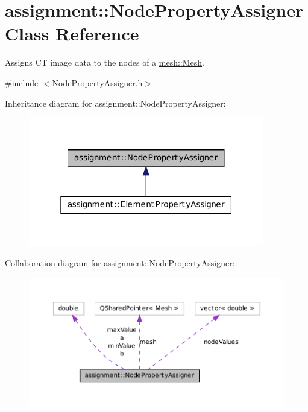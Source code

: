 \hypertarget{classassignment_1_1_node_property_assigner}{
\section{assignment::NodePropertyAssigner Class Reference}
\label{classassignment_1_1_node_property_assigner}
}


Assigns CT image data to the nodes of a \hyperlink{classmesh_1_1_mesh}{mesh::Mesh}.  




{\ttfamily \#include $<$NodePropertyAssigner.h$>$}



Inheritance diagram for assignment::NodePropertyAssigner:\nopagebreak
\begin{figure}[H]
\begin{center}
\leavevmode
\includegraphics[width=292pt]{classassignment_1_1_node_property_assigner__inherit__graph}
\end{center}
\end{figure}


Collaboration diagram for assignment::NodePropertyAssigner:\nopagebreak
\begin{figure}[H]
\begin{center}
\leavevmode
\includegraphics[width=400pt]{classassignment_1_1_node_property_assigner__coll__graph}
\end{center}
\end{figure}
